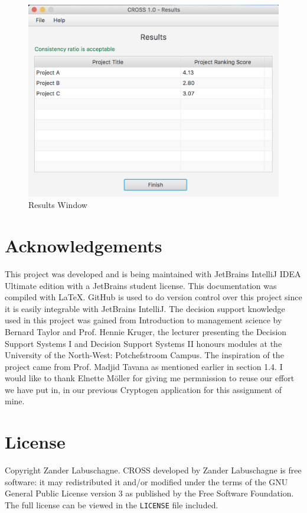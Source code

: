 \documentclass[11pt]{article}
\newcommand{\code}[1]{\texttt{#1}}
\begin{document}
		\begin{figure}[!htb]
			\centering
			\includegraphics[scale=0.55]{results}
			\caption{Results Window} %
			\label{fig:results} %
		\end{figure}

	\newpage


	\section{Acknowledgements}
		This project was developed and is being maintained with JetBrains IntelliJ IDEA Ultimate edition with a JetBrains student license. This documentation was compiled with \LaTeX. GitHub is used to do version control over this project since it is easily integrable with JetBrains IntelliJ. The decision support knowledge used in this project was gained from Introduction to management science by Bernard Taylor \cite{taylor2004introduction} and Prof. Hennie Kruger, the lecturer presenting the Decision Support Systems I and Decision Support Systems II honours modules at the University of the North-West: Potchefstroom Campus. The inspiration of the project came from Prof. Madjid Tavana as mentioned earlier in section 1.4. I would like to thank Elnette M\"oller for giving me permnission to reuse our effort we have put in, in our previous Cryptogen application for this assignment of mine.
		
	\newpage

	\section{License}
		Copyright \textcopyright {} Zander Labuschagne. CROSS developed by Zander Labuschagne is free software: it may redistributed it and/or modified under the terms of the GNU General Public License version 3 as published by the Free Software Foundation. The full license can be viewed in the \code{LICENSE} file included.
\end{document}
